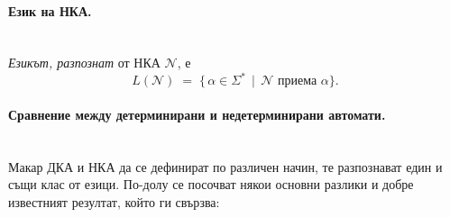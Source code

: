 \paragraph{Език на НКА.}
\mbox{}\\
\emph{Езикът, разпознат} от НКА $\mathcal{N}$, е
\[
	L(\mathcal{N}) \;=\; \{\,\alpha \in \Sigma^* \,\mid\, \text{$\mathcal{N}$ приема $\alpha$}\}.
\]

\medskip

\paragraph*{Сравнение между детерминирани и недетерминирани автомати.}
\label{subsec:comparison_dfa_nfa}
\mbox{}\\
Макар ДКА и НКА да се дефинират по различен начин, те разпознават един и същи клас от езици. По-долу се посочват някои основни разлики и добре известният резултат, който ги свързва:
